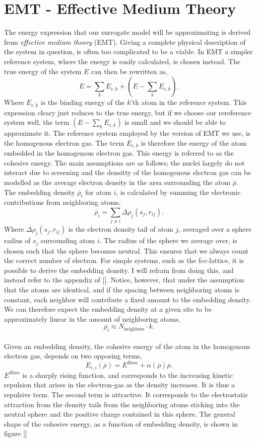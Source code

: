 \documentclass[working, oneside]{../../../Preambles/marginclass}
\begin{document}
\section{EMT - Effective Medium Theory}
The energy expression that our surrogate model will be approximating is derived from \textit{effective medium theory} (EMT). Giving a complete physical description of the system in question, is often too complicated to be a viable. In EMT a simpler reference system, where the energy is easily calculated, is chosen instead. The true energy of the system $E$ can then be rewritten as,
 \[
E = \sum_k E_{c,k} + \left( E - \sum_k E_{c,k} \right)  
.\] 
Where $E_{c,k}$ is the binding energy of the $k$'th atom in the reference system. This expression cleary just reduces to the true energy, but if we choose our rereference system well, the term $\left( E - \sum_k E_{c,k} \right) $ is small and we should be able to approximate it. The reference system employed by the version of EMT we use, is the homogenous electron gas. The term $E_{c,k}$ is therefore the energy of the atom embedded in the homogenous electron gas. This energy is referred to as the cohesive energy. The main assumptions are as follows; the nuclei largely do not interact due to screening and the densitty of the homogenous electron gas can be modelled as the average electron density in the area surrounding the atom $\overline{\rho }$.\\
The embedding density $\overline{\rho }_i$ for atom $i$, is calculated by summing the electronic contributions from neighboring atoms,
 \[
\overline{\rho }_i = \sum_{j \neq i} \Delta \rho_j \left( s_j, r_{ij} \right) 
.\] 
Where $\Delta \rho_j \left( s_j, r_{ij} \right) $ is the electron density tail of atom $j$, averaged over a sphere radius of $s_j$ surrounding atom $i$. The radius of the sphere we average over, is chosen such that the sphere becomes neutral. This ensures that we always count the correct number of electron. For simple systems, such as the fcc-lattice, it is possible to derive the embedding density. I will refrain from doing this, and instead refer to the appendix of []. Notice, however, that under the assumption that the atoms are identical, and if the spacing between neighboring atoms is constant, each neighbor will contribute a fixed amount to the embedding density. We can therefore expect the embedding density at a given site to be approximately linear in the amount of neighboring atoms,
\[
\overline{\rho _i} \approx N_{\text{neighbors}} \cdot k
.\] \\
Given an embedding density, the cohesive energy of the atom in the homogenous electron gas, depends on two opposing terms,
 \[
E_{c, i}\left( \overline{\rho } \right) = E^{Hom} + \alpha\left( \overline{\rho } \right) \overline{\rho }
.\] 
$E^{Hom}$ is a sharply rising function, and corresponds to the increasing kinetic repulsion that arises in the electron-gas as the density increases. It is thus a repulsive term. The second term is attractive. It corresponds to the electrostatic attraction from the density tails from the neighboring atoms sticking into the neutral sphere and the positive charge contained in this sphere. The general shape of the cohesive energy, as a function of embedding density, is shown in figure []
\end{document}
